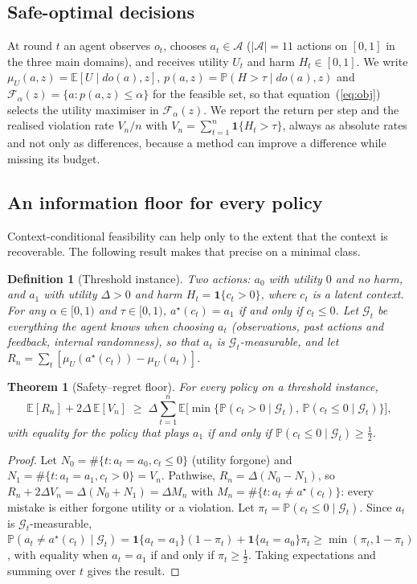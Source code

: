 \documentclass[10pt,a4paper]{article}
\newtheorem{theorem}{Theorem}
\newtheorem{definition}{Definition}
\begin{document}
\subsection*{Safe-optimal decisions}
At round $t$ an agent observes $o_t$, chooses $a_t\in\mathcal A$ ($|\mathcal A|=11$ actions on
$[0,1]$ in the three main domains), and receives utility $U_t$ and harm $H_t\in[0,1]$. We write
$\mu_U(a,z)=\mathbb E[U\mid do(a),z]$, $p(a,z)=\mathbb P(H>\tau\mid do(a),z)$ and
$\mathcal F_\alpha(z)=\{a:p(a,z)\le\alpha\}$ for the feasible set, so that equation~(\ref{eq:obj})
selects the utility maximiser in $\mathcal F_\alpha(z)$. We report the return per step and the
realised violation rate $V_n/n$ with $V_n=\sum_{t=1}^n\mathbf 1\{H_t>\tau\}$, always as absolute
rates and not only as differences, because a method can improve a difference while missing its
budget.

\subsection*{An information floor for every policy}
Context-conditional feasibility can help only to the extent that the context is recoverable. The
following result makes that precise on a minimal class.

\begin{definition}[Threshold instance]
Two actions: $a_0$ with utility $0$ and no harm, and $a_1$ with utility $\Delta>0$ and harm
$H_t=\mathbf 1\{c_t>0\}$, where $c_t$ is a latent context. For any $\alpha\in[0,1)$ and
$\tau\in[0,1)$, $a^\star(c_t)=a_1$ if and only if $c_t\le 0$. Let $\mathcal G_t$ be everything the
agent knows when choosing $a_t$ (observations, past actions and feedback, internal randomness), so
that $a_t$ is $\mathcal G_t$-measurable, and let $R_n=\sum_t[\mu_U(a^\star(c_t))-\mu_U(a_t)]$.
\end{definition}

\begin{theorem}[Safety--regret floor]\label{thm:floor}
For every policy on a threshold instance,
\begin{equation}
\mathbb E[R_n]+2\Delta\,\mathbb E[V_n]\;\ge\;\Delta\sum_{t=1}^n
\mathbb E\big[\min\{\mathbb P(c_t>0\mid\mathcal G_t),\,\mathbb P(c_t\le0\mid\mathcal G_t)\}\big],
\label{eq:floor}
\end{equation}
with equality for the policy that plays $a_1$ if and only if $\mathbb P(c_t\le0\mid\mathcal G_t)\ge\tfrac12$.
\end{theorem}

\begin{proof}
Let $N_0=\#\{t:a_t=a_0,c_t\le0\}$ (utility forgone) and $N_1=\#\{t:a_t=a_1,c_t>0\}=V_n$. Pathwise,
$R_n=\Delta(N_0-N_1)$, so $R_n+2\Delta V_n=\Delta(N_0+N_1)=\Delta M_n$ with
$M_n=\#\{t:a_t\ne a^\star(c_t)\}$: every mistake is either forgone utility or a violation. Let
$\pi_t=\mathbb P(c_t\le0\mid\mathcal G_t)$. Since $a_t$ is $\mathcal G_t$-measurable,
$\mathbb P(a_t\ne a^\star(c_t)\mid\mathcal G_t)=\mathbf 1\{a_t=a_1\}(1-\pi_t)+\mathbf 1\{a_t=a_0\}\pi_t
\ge\min(\pi_t,1-\pi_t)$, with equality when $a_t=a_1$ if and only if $\pi_t\ge\tfrac12$. Taking
expectations and summing over $t$ gives the result.
\end{proof}
\end{document}
